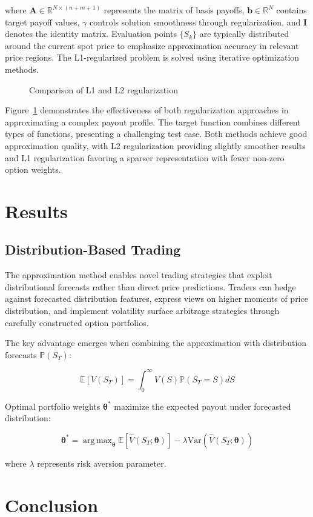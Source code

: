 \documentclass[12pt]{article}
\DeclareMathOperator*{\argmax}{arg\,max}
\begin{document}
where $\mathbf{A} \in \mathbb{R}^{N \times (n+m+1)}$ represents the matrix of basis 
payoffs, $\mathbf{b} \in \mathbb{R}^N$ contains target payoff values, $\gamma$ 
controls solution smoothness through regularization, and $\mathbf{I}$ denotes the 
identity matrix. Evaluation points $\{S_k\}$ are typically distributed around the 
current spot price to emphasize approximation accuracy in relevant price regions. 
The L1-regularized problem is solved using iterative optimization methods.

\begin{figure}[htbp]
\centering

\caption{Comparison of L1 and L2 regularization}
\label{fig:regularization}
\end{figure}

Figure~\ref{fig:regularization} demonstrates the effectiveness of both regularization 
approaches in approximating a complex payout profile. The target function combines 
different types of functions, presenting a challenging test case. Both 
methods achieve good approximation quality, with L2 regularization providing slightly 
smoother results and L1 regularization favoring a sparser representation with fewer 
non-zero option weights.

\section{Results}
\subsection{Distribution-Based Trading}
The approximation method enables novel trading strategies that exploit distributional 
forecasts rather than direct price predictions. Traders can hedge against forecasted 
distribution features, express views on higher moments of price distribution, and 
implement volatility surface arbitrage strategies through carefully constructed 
option portfolios.

The key advantage emerges when combining the approximation with distribution 
forecasts $\mathbb{P}(S_T)$:
 
\begin{equation}
\mathbb{E}[V(S_T)] = 
    \int_{0}^{\infty} 
        V(S) \mathbb{P}(S_T = S) dS
\end{equation}

Optimal portfolio weights $\boldsymbol{\theta}^*$ maximize the expected payout under 
forecasted distribution:

\begin{equation}
\boldsymbol{\theta}^* = 
    \argmax_{\boldsymbol{\theta}} 
        \mathbb{E}\left[\hat{V}(S_T;\boldsymbol{\theta})\right] - 
        \lambda \text{Var}\left(\hat{V}(S_T;\boldsymbol{\theta})\right)
\end{equation}

where $\lambda$ represents risk aversion parameter.

\section{Conclusion}



\end{document}
